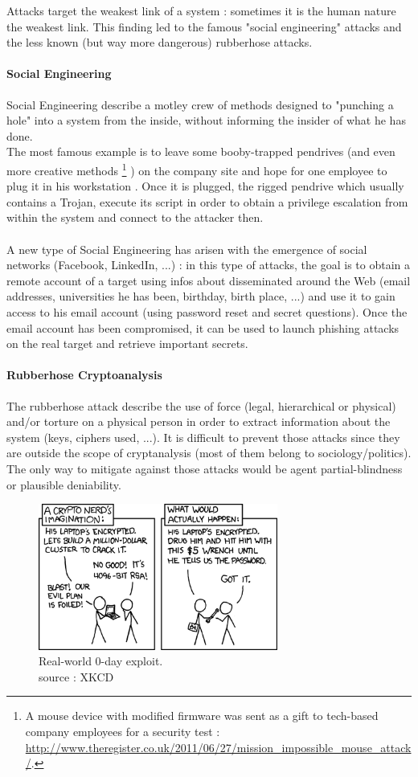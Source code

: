 Attacks target the weakest link of a system : sometimes it is the human nature the weakest link. This finding led to the famous "social engineering" attacks and the less known (but way more dangerous) rubberhose attacks.

\paragraph{Social Engineering}

Social Engineering describe a motley crew of methods designed to "punching a hole" into a system from the inside, without informing the insider of what he has done. \\
The most famous example is to leave some booby-trapped pendrives (and even more creative methods 
\footnote{ A mouse device with modified firmware was sent as a gift to tech-based company employees for a security test : \url{ http://www.theregister.co.uk/2011/06/27/mission_impossible_mouse_attack/}.  }
) on the company site and hope for one employee to plug it in his workstation . Once it is plugged, the rigged pendrive which usually contains a Trojan, execute its script in order to obtain a privilege escalation from within the system and connect to the attacker then.\\\\
A new type of Social Engineering has arisen with the emergence of social networks (Facebook, LinkedIn, ...) : in this type of attacks, the goal is to obtain a remote account of a target using infos about disseminated around the Web (email addresses, universities he has been, birthday, birth place, ...) and use it to gain access to his email account (using password reset and secret questions). Once the email account has been compromised, it can be used to launch phishing attacks on the real target and retrieve important secrets.


\paragraph{Rubberhose Cryptoanalysis}

The rubberhose attack describe the use of force (legal, hierarchical or physical) and/or torture on a physical person in order to extract information about the system (keys, ciphers used, ...). It is difficult to prevent those attacks since they are outside the scope of cryptanalysis (most of them belong to sociology/politics). The only way to mitigate against those attacks would be agent partial-blindness or plausible deniability.

\begin{figure}[hb!]
    \centering
       \includegraphics[width=0.7\textwidth]{images/rubberhose.png}
	\caption{Real-world 0-day exploit. \\ source : XKCD}
	\label{fig:RC4}
\end{figure}
